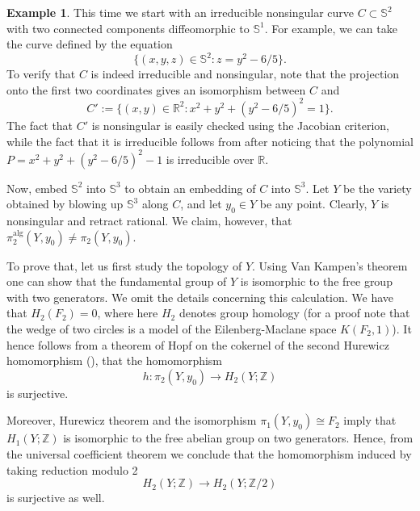 \documentclass{article}
\theoremstyle{plain}
\theoremstyle{definition}
\newtheorem{ex}[thm]{Example}
\theoremstyle{remark}
\newcommand{\R}{\mathbb{R}}
\newcommand{\s}{\mathbb{S}}
\newcommand{\alg}{\mathrm{alg}}
\begin{document}
\begin{ex}\label{ex_2}
This time we start with an irreducible nonsingular curve $C\subset \s^2$ with two connected components diffeomorphic to $\s^1$. For example, we can take the curve defined by the equation
\begin{equation*}
    \{(x,y,z)\in\s^2:z=y^2-6/5\}.
\end{equation*}
To verify that $C$ is indeed irreducible and nonsingular, note that the projection onto the first two coordinates gives an isomorphism between $C$ and 
\begin{equation*}
    C':=\{(x,y)\in \R^2:x^2+y^2+(y^2-6/5)^2=1\}.
\end{equation*}
The fact that $C'$ is nonsingular is easily checked using the Jacobian criterion, while the fact that it is irreducible follows from \cite[Theorem 4.5.1]{bochnakRealAlgebraicGeometry1998} after noticing that the polynomial $P=x^2+y^2+(y^2-6/5)^2-1$ is irreducible over $\R$.

Now, embed $\s^2$ into $\s^3$ to obtain an embedding of $C$ into $\s^3$. Let $Y$ be the variety obtained by blowing up $\s^3$ along $C$, and let $y_0\in Y$ be any point. Clearly, $Y$ is nonsingular and retract rational. We claim, however, that $\pi_2^\alg(Y,y_0)\neq \pi_2(Y,y_0)$.

To prove that, let us first study the topology of $Y$. Using Van Kampen's theorem one can show that the fundamental group of $Y$ is isomorphic to the free group with two generators. We omit the details concerning this calculation. We have that $H_2(F_2)=0$, where here $H_2$ denotes group homology (for a proof note that the wedge of two circles is a model of the Eilenberg-Maclane space $K(F_2,1)$). It hence follows from a theorem of Hopf on the cokernel of the second Hurewicz homomorphism (\cite[p. 257, Assertion a]{hopfFundamentalgruppeUndZweite1941}), that the homomorphism
\begin{equation*}
    h:\pi_2(Y,y_0)\rightarrow H_2(Y;\mathbb Z)
\end{equation*}
is surjective. 

Moreover, Hurewicz theorem and the isomorphism $\pi_1(Y,y_0)\cong F_2$ imply that $H_1(Y;\mathbb Z)$ is isomorphic to the free abelian group on two generators. Hence, from the universal coefficient theorem we conclude that the homomorphism induced by taking reduction modulo 2
\begin{equation*}
    H_2(Y;\mathbb Z)\rightarrow H_2(Y;\mathbb Z/2)
\end{equation*}
is surjective as well.


\end{ex}
\end{document}
